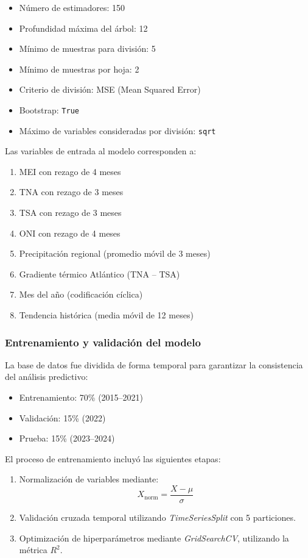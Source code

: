 \begin{itemize}
    \item Número de estimadores: 150
    \item Profundidad máxima del árbol: 12
    \item Mínimo de muestras para división: 5
    \item Mínimo de muestras por hoja: 2
    \item Criterio de división: MSE (Mean Squared Error)
    \item Bootstrap: \texttt{True}
    \item Máximo de variables consideradas por división: \texttt{sqrt}
\end{itemize}

Las variables de entrada al modelo corresponden a:

\begin{enumerate}
    \item MEI con rezago de 4 meses
    \item TNA con rezago de 3 meses
    \item TSA con rezago de 3 meses
    \item ONI con rezago de 4 meses
    \item Precipitación regional (promedio móvil de 3 meses)
    \item Gradiente térmico Atlántico (TNA -- TSA)
    \item Mes del año (codificación cíclica)
    \item Tendencia histórica (media móvil de 12 meses)
\end{enumerate}

\subsubsection{Entrenamiento y validación del modelo}

La base de datos fue dividida de forma temporal para garantizar la consistencia del análisis predictivo:

\begin{itemize}
    \item Entrenamiento: 70\% (2015--2021)
    \item Validación: 15\% (2022)
    \item Prueba: 15\% (2023--2024)
\end{itemize}

El proceso de entrenamiento incluyó las siguientes etapas:

\begin{enumerate}
    \item Normalización de variables mediante:
    \begin{equation}
        X_{\text{norm}} = \frac{X - \mu}{\sigma}
    \end{equation}
    \item Validación cruzada temporal utilizando \textit{TimeSeriesSplit} con 5 particiones.
    \item Optimización de hiperparámetros mediante \textit{GridSearchCV}, utilizando la métrica $R^2$.
\end{enumerate}

